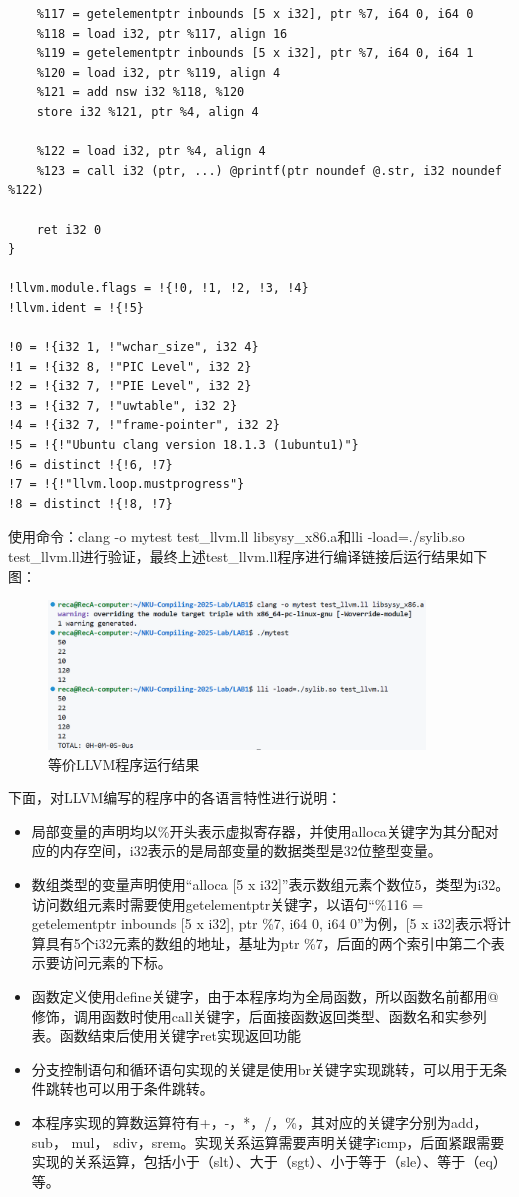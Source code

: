\documentclass[UTF8,a4paper,10pt]{ctexart}
\begin{document}
\begin{lstlisting}
	%117 = getelementptr inbounds [5 x i32], ptr %7, i64 0, i64 0
	%118 = load i32, ptr %117, align 16
	%119 = getelementptr inbounds [5 x i32], ptr %7, i64 0, i64 1
	%120 = load i32, ptr %119, align 4
	%121 = add nsw i32 %118, %120
	store i32 %121, ptr %4, align 4

	%122 = load i32, ptr %4, align 4
	%123 = call i32 (ptr, ...) @printf(ptr noundef @.str, i32 noundef %122)

	ret i32 0
}

!llvm.module.flags = !{!0, !1, !2, !3, !4}
!llvm.ident = !{!5}

!0 = !{i32 1, !"wchar_size", i32 4}
!1 = !{i32 8, !"PIC Level", i32 2}
!2 = !{i32 7, !"PIE Level", i32 2}
!3 = !{i32 7, !"uwtable", i32 2}
!4 = !{i32 7, !"frame-pointer", i32 2}
!5 = !{!"Ubuntu clang version 18.1.3 (1ubuntu1)"}
!6 = distinct !{!6, !7}
!7 = !{!"llvm.loop.mustprogress"}
!8 = distinct !{!8, !7}
\end{lstlisting}

使用命令：clang -o mytest test\_llvm.ll libsysy\_x86.a和lli -load=./sylib.so test\_llvm.ll进行验证，最终上述test\_llvm.ll程序进行编译链接后运行结果如下图：

\begin{figure}[H]
	\centering
	\includegraphics[width=10cm]{mytest-result.png}
	\caption{等价LLVM程序运行结果}
\end{figure}

下面，对LLVM编写的程序中的各语言特性进行说明：

\begin{itemize}
	\item 局部变量的声明均以\%开头表示虚拟寄存器，并使用alloca关键字为其分配对应的内存空间，i32表示的是局部变量的数据类型是32位整型变量。
	\item 数组类型的变量声明使用“alloca [5 x i32]”表示数组元素个数位5，类型为i32。访问数组元素时需要使用getelementptr关键字，以语句“\%116 = getelementptr inbounds [5 x i32], ptr \%7, i64 0, i64 0”为例，[5 x i32]表示将计算具有5个i32元素的数组的地址，基址为ptr \%7，后面的两个索引中第二个表示要访问元素的下标。
	\item 函数定义使用define关键字，由于本程序均为全局函数，所以函数名前都用@修饰，调用函数时使用call关键字，后面接函数返回类型、函数名和实参列表。函数结束后使用关键字ret实现返回功能
	\item 分支控制语句和循环语句实现的关键是使用br关键字实现跳转，可以用于无条件跳转也可以用于条件跳转。
	\item 本程序实现的算数运算符有+，-，*，/，\%，其对应的关键字分别为add，sub， mul， sdiv，srem。实现关系运算需要声明关键字icmp，后面紧跟需要实现的关系运算，包括小于（slt）、大于（sgt）、小于等于（sle）、等于（eq）等。
\end{itemize}
\end{document}
